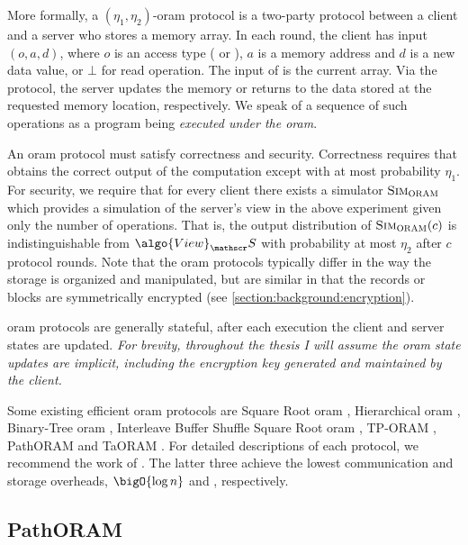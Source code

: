 		More formally, a $(\eta_1, \eta_2)$-\acrshort{oram} protocol is a two-party protocol between a client \client{} and a server \server{} who stores a memory array.
		In each round, the client \client{} has input $(o, a, d)$, where $o$ is an access type (\oramRead{} or \oramWrite{}), $a$ is a memory address and $d$ is a new data value, or $\bot$ for read operation.
		The input of \server{} is the current array.
		Via the protocol, the server updates the memory or returns to \user{} the data stored at the requested memory location, respectively.
		We speak of a sequence of such operations as a program \oramProgram{} being \emph{executed under the \acrshort{oram}}.

		An \acrshort{oram} protocol must satisfy correctness and security.
		Correctness requires that \client{} obtains the correct output of the computation except with at most probability $\eta_1$.
		For security, we require that for every client \client{} there exists a simulator $\textsc{Sim}_{\textsc{ORAM}}$ which provides a simulation of the server's view in the above experiment given only the number of operations.
		That is, the output distribution of $\textsc{Sim}_{\textsc{ORAM}} (c)$ is indistinguishable from $\algo{View}_\server$ with probability at most $\eta_2$ after $c$ protocol rounds.
		Note that the \acrshort{oram} protocols typically differ in the way the storage is organized and manipulated, but are similar in that the records or blocks are symmetrically encrypted (see \cref{section:background:encryption}).

		\acrshort{oram} protocols are generally stateful, after each execution the client and server states are updated.
		\emph{For brevity, throughout the thesis I will assume the \acrshort{oram} state updates are implicit, including the encryption key \key{} generated and maintained by the client.}

		Some existing efficient \acrshort{oram} protocols are Square Root \acrshort{oram} \cite{oram-theory}, Hierarchical \acrshort{oram} \cite{oram-original}, Binary-Tree \acrshort{oram} \cite{binary-tree-oram}, Interleave Buffer Shuffle Square Root \acrshort{oram} \cite{shortest-path-oram}, TP-ORAM \cite{tp-oram}, PathORAM \cite{path-oram} and TaORAM \cite{taostore}.
		For detailed descriptions of each protocol, we recommend the work of \textcite{oram-survey-feifei}.
		The latter three  achieve the lowest communication and storage overheads, $\bigO{\log \dataSize}$ and \bigO{\dataSize}, respectively.

		\subsection{PathORAM}

